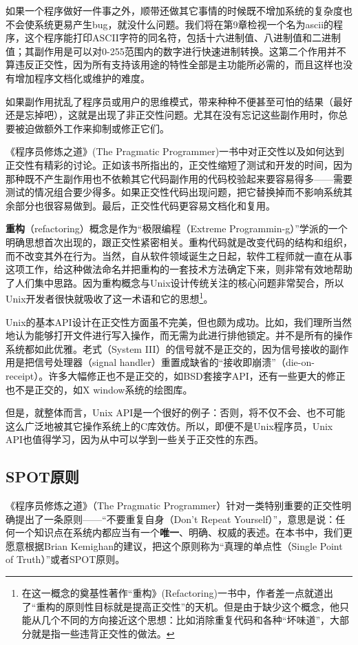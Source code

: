 \documentclass[12pt,oneside]{book}
\begin{document}
如果一个程序做好一件事之外，顺带还做其它事情的时候既不增加系统的复杂度也不会使系统更易产生bug，就没什么问题。我们将在第9章检视一个名为ascii的程序，这个程序能打印ASCII字符的同名符，包括十六进制值、八进制值和二进制值；其副作用是可以对0-255范围内的数字进行快速进制转换。这第二个作用并不算违反正交性，因为所有支持该用途的特性全部是主功能所必需的，而且这样也没有增加程序文档化或维护的难度。

如果副作用扰乱了程序员或用户的思维模式，带来种种不便甚至可怕的结果（最好还是忘掉吧），这就是出现了非正交性问题。尤其在没有忘记这些副作用时，你总要被迫做额外工作来抑制或修正它们。

《程序员修炼之道》(The Pragmatic Programmer)\cite{Hunt-Thomas}一书中对正交性以及如何达到正交性有精彩的讨论。正如该书所指出的，正交性缩短了测试和开发的时间，因为那种既不产生副作用也不依赖其它代码副作用的代码校验起来要容易得多——需要测试的情况组合要少得多。如果正交性代码出现问题，把它替换掉而不影响系统其余部分也很容易做到。最后，正交性代码更容易文档化和复用。

\textbf{重构}（refactoring）概念是作为“极限编程（Extreme Programmin-g）”学派的一个明确思想首次出现的，跟正交性紧密相关。重构代码就是改变代码的结构和组织，而不改变其外在行为。当然，自从软件领域诞生之日起，软件工程师就一直在从事这项工作，给这种做法命名并把重构的一套技术方法确定下来，则非常有效地帮助了人们集中思路。因为重构概念与Unix设计传统关注的核心问题非常契合，所以Unix开发者很快就吸收了这一术语和它的思想\footnote{在这一概念的奠基性著作“重构》(Refactoring)\cite{Fowler}一书中，作者差一点就道出了“重构的原则性目标就是提高正交性”的天机。但是由于缺少这个概念，他只能从几个不同的方向接近这个思想：比如消除重复代码和各种“坏味道”，大部分就是指一些违背正交性的做法。}。

Unix的基本API设计在正交性方面虽不完美，但也颇为成功。比如，我们理所当然地认为能够打开文件进行写入操作，而无需为此进行排他锁定。并不是所有的操作系统都如此优雅。老式（System III）的信号就不是正交的，因为信号接收的副作用是把信号处理器（signal handler）重置成缺省的“接收即崩溃”（die-on-receipt）。许多大幅修正也不是正交的，如BSD套接字API，还有一些更大的修正也不是正交的，如X window系统的绘图库。

但是，就整体而言，Unix API是一个很好的例子：否则，将不仅不会、也不可能这么广泛地被其它操作系统上的C库效仿。所以，即便不是Unix程序员，Unix API也值得学习，因为从中可以学到一些关于正交性的东西。


\subsection{SPOT原则}
《程序员修炼之道》（The Pragmatic Programmer）针对一类特别重要的正交性明确提出了一条原则——“不要重复自身（Don't Repeat Yourself）”，意思是说：任何一个知识点在系统内都应当有一个\textbf{唯一}、明确、权威的表述。在本书中，我们更愿意根据Brian Kemighan的建议，把这个原则称为“真理的单点性（Single Point of Truth）”或者SPOT原则。
\end{document}
